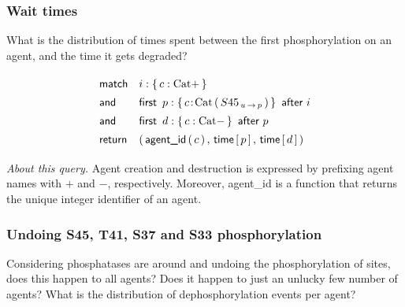 
\subsubsection*{Wait times}

What is the distribution of times spent
between the first phosphorylation on an agent, and the time it gets
degraded?


\begin{small}
\begin{equation}
  \Query{
    \m{match} & i:\Set{  c:\BetaCat+ } \\
    \m{and} & \FirstAfter{p:\Set{
        \iAG{c}{\BetaCat}{{S45}_{\Trans{u}{p}}}
    }}{i} \\
    \m{and} & \FirstAfter{ d:\Set{
        c:\BetaCat-
    } }{p} \\
    \m{return} & \Par{\AgentId{c},\, \Time{p},\, \Time{d}}
  } 
\end{equation}
\end{small}

\noindent \textit{About this query.} Agent creation and destruction is
expressed by prefixing agent names with $+$ and $-$,
respectively. Moreover, \textsf{agent\_id} is a function that returns
the unique integer identifier of an agent.


\subsubsection*{Undoing S45, T41, S37 and S33 phosphorylation}
Considering phosphatases are around and undoing the phosphorylation of
sites, does this happen to all agents? Does it happen to just an
unlucky few number of agents? What is the distribution of
dephosphorylation events per agent?





